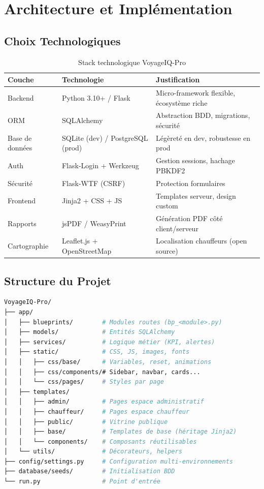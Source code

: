 \documentclass[12pt,a4paper]{report}
\begin{document}
\chapter{Architecture et Implémentation}

\section{Choix Technologiques}

\begin{table}[h!]
\centering
\caption{Stack technologique VoyageIQ-Pro}
\begin{tabularx}{\textwidth}{llX}
\toprule
\textbf{Couche} & \textbf{Technologie} & \textbf{Justification} \\
\midrule
Backend    & Python 3.10+ / Flask    & Micro-framework flexible, écosystème riche \\
ORM        & SQLAlchemy              & Abstraction BDD, migrations, sécurité \\
Base de données & SQLite (dev) / PostgreSQL (prod) & Légèreté en dev, robustesse en prod \\
Auth       & Flask-Login + Werkzeug  & Gestion sessions, hachage PBKDF2 \\
Sécurité   & Flask-WTF (CSRF)        & Protection formulaires \\
Frontend   & Jinja2 + CSS + JS       & Templates serveur, design custom \\
Rapports   & jsPDF / WeasyPrint      & Génération PDF côté client/serveur \\
Cartographie & Leaflet.js + OpenStreetMap & Localisation chauffeurs (open source) \\
\bottomrule
\end{tabularx}
\end{table}

\section{Structure du Projet}

\begin{lstlisting}[language=bash, caption=Arborescence principale VoyageIQ-Pro]
VoyageIQ-Pro/
├── app/
│   ├── blueprints/        # Modules routes (bp_<module>.py)
│   ├── models/            # Entités SQLAlchemy
│   ├── services/          # Logique métier (KPI, alertes)
│   ├── static/            # CSS, JS, images, fonts
│   │   ├── css/base/      # Variables, reset, animations
│   │   ├── css/components/# Sidebar, navbar, cards...
│   │   └── css/pages/     # Styles par page
│   ├── templates/
│   │   ├── admin/         # Pages espace administratif
│   │   ├── chauffeur/     # Pages espace chauffeur
│   │   ├── public/        # Vitrine publique
│   │   ├── base/          # Templates de base (héritage Jinja2)
│   │   └── components/    # Composants réutilisables
│   └── utils/             # Décorateurs, helpers
├── config/settings.py     # Configuration multi-environnements
├── database/seeds/        # Initialisation BDD
└── run.py                 # Point d'entrée
\end{lstlisting}
\end{document}
